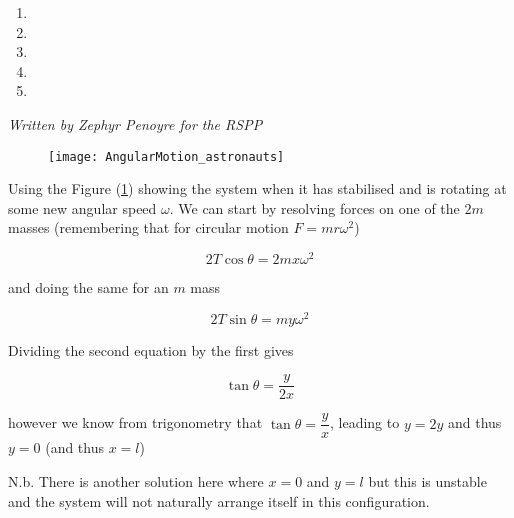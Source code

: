 
\begin{problem}
{ 
\begin{enumerate}
	\item {}
	\item {}
	\item {}
	\item {}
	\item {}\correct
\end{enumerate}
  }
{\textit{Written by Zephyr Penoyre for the RSPP}}
{

\begin{figure}[h]
\centering
\texttt{[image: AngularMotion\_astronauts]}
\caption{}
\label{fig:AngularMotion_astronauts}
\end{figure}

Using the Figure (\ref{fig:AngularMotion_astronauts}) showing the system when it has stabilised and is rotating at some new angular speed $\omega$. We can start by resolving forces on one of the $2m$ masses (remembering that for circular motion $F = mr\omega^2$)

\begin{equation*}
2T\cos{\theta} = 2mx\omega^2
\end{equation*}

and doing the same for an $m$ mass

\begin{equation*}
2T\sin{\theta} = my\omega^2
\end{equation*}

Dividing the second equation by the first gives

\begin{equation*}
\tan{\theta} = \dfrac{y}{2x}
\end{equation*}

however we know from trigonometry that $\tan{\theta} = \dfrac{y}{x}$, leading to $y = 2y$ and thus $y=0$ (and thus $x=l$)

N.b. There is another solution here where $x=0$ and $y=l$ but this is unstable and the system will not naturally arrange itself in this configuration.
}
\end{problem}